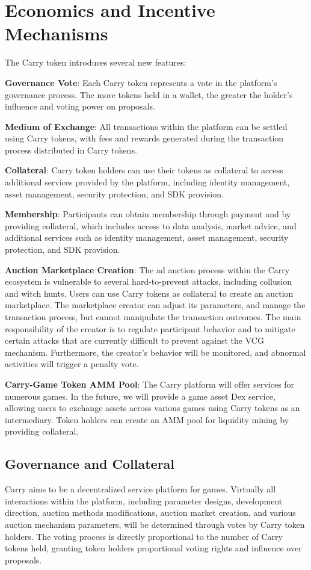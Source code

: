 \section{Economics and Incentive Mechanisms}


The Carry token introduces several new features:

\textbf{Governance Vote}: Each Carry token represents a vote in the platform's governance process. The more tokens held in a wallet, the greater the holder's influence and voting power on proposals.

\textbf{Medium of Exchange}: All transactions within the platform can be settled using Carry tokens, with fees and rewards generated during the transaction process distributed in Carry tokens.

\textbf{Collateral}: Carry token holders can use their tokens as collateral to access additional services provided by the platform, including identity management, asset management, security protection, and SDK provision.

\textbf{Membership}: Participants can obtain membership through payment and by providing collateral, which includes access to data analysis, market advice, and additional services such as identity management, asset management, security protection, and SDK provision.

\textbf{Auction Marketplace Creation}: The ad auction process within the Carry ecosystem is vulnerable to several hard-to-prevent attacks, including collusion and witch hunts. Users can use Carry tokens as collateral to create an auction marketplace. The marketplace creator can adjust its parameters, and manage the transaction process, but cannot manipulate the transaction outcomes. The main responsibility of the creator is to regulate participant behavior and to mitigate certain attacks that are currently difficult to prevent against the VCG mechanism. Furthermore, the creator's behavior will be monitored, and abnormal activities will trigger a penalty vote.

\textbf{Carry-Game Token AMM Pool}: The Carry platform will offer services for numerous games. In the future, we will provide a game asset Dex service, allowing users to exchange assets across various games using Carry tokens as an intermediary. Token holders can create an AMM pool for liquidity mining by providing collateral.

\subsection{Governance and Collateral}
Carry aims to be a decentralized service platform for games. Virtually all interactions within the platform, including parameter designs, development direction, auction methods modifications, auction market creation, and various auction mechanism parameters, will be determined through votes by Carry token holders. The voting process is directly proportional to the number of Carry tokens held, granting token holders proportional voting rights and influence over proposals.

